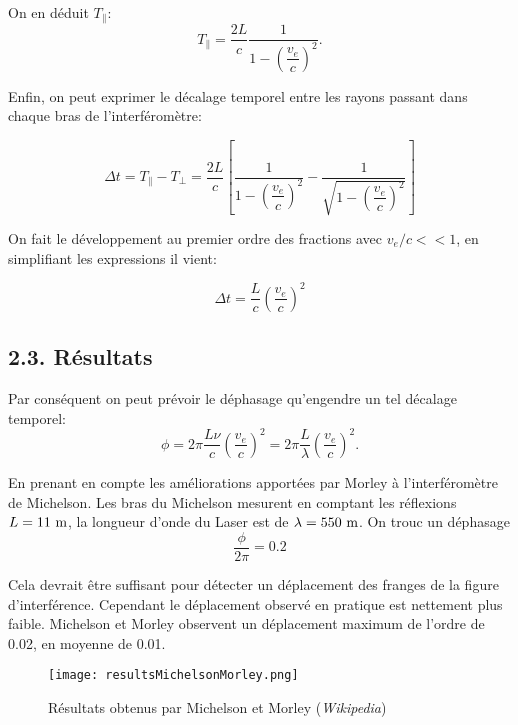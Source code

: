\documentclass[french, a4paper, 10pt, twocolumn, landscape]{article}
\begin{document}
On en déduit $T_\parallel$:
\begin{equation}
	T_\parallel=\dfrac{2L}{c}\dfrac{1}{1-\left(\dfrac{v_e}{c}\right)^2}.
\end{equation}

Enfin, on peut exprimer le décalage temporel entre les rayons passant dans chaque bras de l'interféromètre: 

\begin{equation}
	\Delta t = T_\parallel - T_\perp = \dfrac{2L}{c}\left[\dfrac{1}{1-\left(\dfrac{v_e}{c}\right)^2}-\dfrac{1}{\sqrt{1-\left(\dfrac{v_e}{c}\right)^2}}\right]
\end{equation}

On fait le développement au premier ordre des fractions avec $v_e/c <<1$, en simplifiant les expressions il vient: 

\begin{equation}
	\Delta t = \dfrac{L}{c}\left(\dfrac{v_e}{c}\right)^2
\end{equation}

\subsection*{2.3. Résultats}

Par conséquent on peut prévoir le déphasage qu'engendre un tel décalage temporel: 
\begin{equation}
	\phi = 2\pi\dfrac{L\nu}{c}\left(\dfrac{v_e}{c}\right)^2 = 2\pi\dfrac{L}{\lambda}\left(\dfrac{v_e}{c}\right)^2.
\end{equation}

En prenant en compte les améliorations apportées par Morley à l'interféromètre de Michelson. Les bras du Michelson mesurent en comptant les réflexions $L=11~\rm m$, la longueur d'onde du Laser est de $\lambda=550~\rm m$. On trouc un déphasage 
\begin{equation}
	\dfrac{\phi}{2\pi} = 0.2
\end{equation}

Cela devrait être suffisant pour détecter un déplacement des franges de la figure d'interférence. Cependant le déplacement observé en pratique est nettement plus faible. Michelson et Morley observent un déplacement maximum de l'ordre de 0.02, en moyenne de 0.01.

\begin{figure}[ht]
 	\centering
 	\texttt{[image: resultsMichelsonMorley.png]}            \caption{Résultats obtenus par Michelson et Morley (\textit{Wikipedia})}
 \end{figure}
\end{document}
